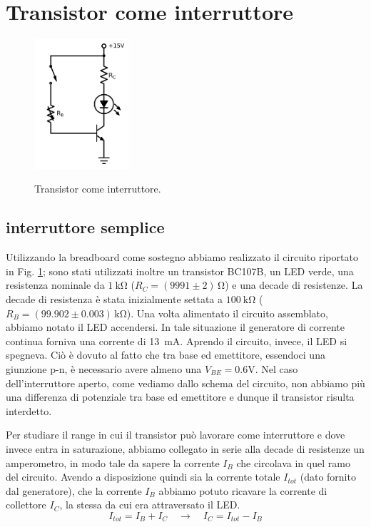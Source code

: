 \section{Transistor come interruttore}

\begin{figure}
	\caption{Transistor come interruttore.}
	\includegraphics[width=35mm]{cc1.pdf}
	\label{fig:cc1}
\end{figure}

\subsection{interruttore semplice}
Utilizzando la breadboard come sostegno abbiamo realizzato il circuito riportato in Fig. \ref{fig:cc1}; sono stati utilizzati inoltre un transistor BC107B, un LED verde, una resistenza nominale da $\SI{1}{\kilo\ohm}$ ($R_C =(9991 \pm 2)\, \si{\ohm}$) e una decade di resistenze. La decade di resistenza è stata inizialmente settata a $\SI{100}{\kilo\ohm}$ ($R_B = (99.902 \pm 0.003)\,\si{\kilo\ohm}$).
Una volta alimentato il circuito assemblato, abbiamo notato il LED accendersi. In tale situazione il generatore di corrente continua forniva una corrente di \SI{13}{\milli\ampere}. Aprendo il circuito, invece, il LED si spegneva. Ciò è dovuto al fatto che tra base ed emettitore, essendoci una giunzione p-n, è necessario avere almeno una $V_{BE}=0.6 \si{\volt}$. Nel caso dell'interruttore aperto, come vediamo dallo schema del circuito, non abbiamo più una differenza di potenziale tra base ed emettitore e dunque il transistor risulta interdetto. 

Per studiare il range in cui il transistor può lavorare come interruttore e dove invece entra in saturazione, abbiamo collegato in serie alla decade di resistenze un amperometro, in modo tale da sapere la corrente $I_B$ che circolava in quel ramo del circuito. Avendo a disposizione quindi sia la corrente totale $I_{tot}$ (dato fornito dal generatore), che la corrente $I_B$ abbiamo potuto ricavare la corrente di collettore $I_C$, la stessa da cui era attraversato il LED.
\begin{equation*}
	I_{tot} = I_B + I_C \quad \rightarrow \quad I_C = I_{tot} - I_B
\end{equation*}

